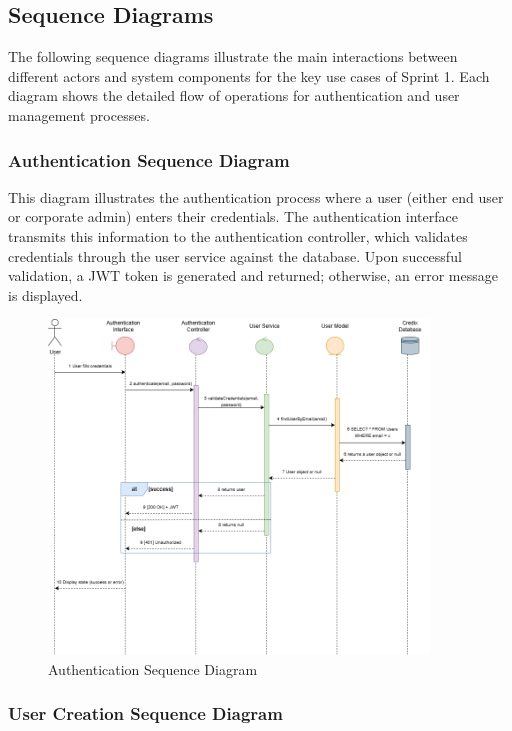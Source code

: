 \subsection{Sequence Diagrams}

The following sequence diagrams illustrate the main interactions between different actors and system components for the key use cases of Sprint 1. Each diagram shows the detailed flow of operations for authentication and user management processes.

\subsubsection{Authentication Sequence Diagram}

This diagram illustrates the authentication process where a user (either end user or corporate admin) enters their credentials. The authentication interface transmits this information to the authentication controller, which validates credentials through the user service against the database. Upon successful validation, a JWT token is generated and returned; otherwise, an error message is displayed.

\begin{figure}[H]
\centering
\includegraphics[width=0.9\textwidth]{images/seq_authentication.png}
\caption{Authentication Sequence Diagram}
\label{fig:seq_authentication}
\end{figure}

\subsubsection{User Creation Sequence Diagram}


